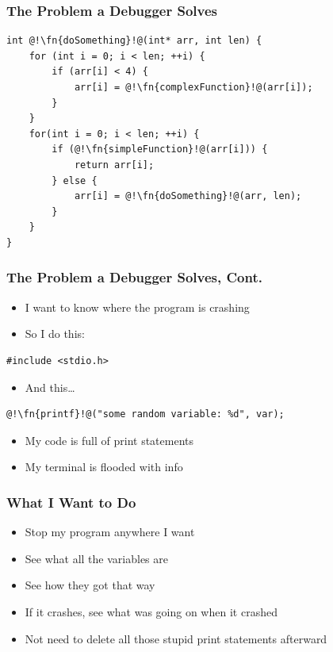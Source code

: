 \documentclass[aspectratio=169]{beamer}
\newcommand{\fn}{\color{identifier}}
\begin{document}
\begin{frame}[fragile]
    \frametitle{The Problem a Debugger Solves}
    \begin{lstlisting}
int @!\fn{doSomething}!@(int* arr, int len) {
    for (int i = 0; i < len; ++i) {
        if (arr[i] < 4) {
            arr[i] = @!\fn{complexFunction}!@(arr[i]);
        }
    }
    for(int i = 0; i < len; ++i) {
        if (@!\fn{simpleFunction}!@(arr[i])) {
            return arr[i];
        } else {
            arr[i] = @!\fn{doSomething}!@(arr, len);
        }
    }
}
    \end{lstlisting}

\end{frame}
\begin{frame}[fragile]
    \frametitle{The Problem a Debugger Solves, Cont.}
    \begin{itemize}
        \item I want to know where the program is crashing
        \item So I do this:
    \end{itemize}
    \begin{lstlisting}[numbers=none]
#include <stdio.h>
    \end{lstlisting}
    \begin{itemize}
        \pause
        \item And this\dots
    \end{itemize}
    \begin{lstlisting}[numbers=none]
@!\fn{printf}!@("some random variable: %d", var);
    \end{lstlisting}
    \begin{itemize}
        \pause
        \item My code is full of print statements
        \item My terminal is flooded with info
    \end{itemize}


\end{frame}
\begin{frame}
    \frametitle{What I Want to Do}

    \begin{itemize}
        \item Stop my program anywhere I want
        \item See what all the variables are
        \item See how they got that way
        \item If it crashes, see what was going on when it crashed
        \item Not need to delete all those stupid print statements afterward
    \end{itemize}

\end{frame}
\end{document}

